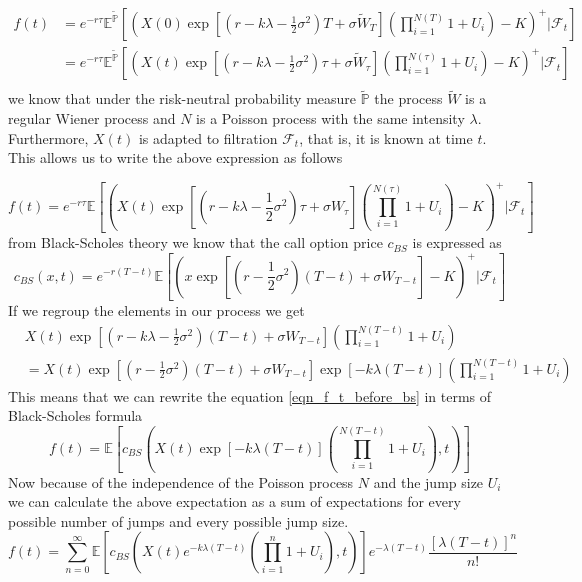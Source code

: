 \documentclass[times, utf8, diplomski]{fer}
\begin{document}
\begin{align*}
	f(t) &= e^{-r\tau} \mathbb{E}^{\tilde{\mathbb{P}}}\left[\left(X(0)\exp\left[ (r - k\lambda- \frac{1}{2}\sigma^2)T + \sigma \tilde{W}_{T} \right]\left(\prod_{i=1}^{N(T)}1+U_i\right) - K \right)^+\Bigg|\mathcal{F}_t\right] \\
		 &= e^{-r\tau} \mathbb{E}^{\tilde{\mathbb{P}}}\left[\left(X(t)\exp\left[ (r - k\lambda- \frac{1}{2}\sigma^2)\tau + \sigma \tilde{W}_{\tau} \right]\left(\prod_{i=1}^{N(\tau)}1+U_i\right) - K \right)^+\Bigg|\mathcal{F}_t\right] \\
\end{align*} we know that under the risk-neutral probability measure $\tilde{\mathbb{P}}$ the process $\tilde{W}$ is a regular Wiener process and $N$ is a Poisson process with the same intensity $\lambda$. Furthermore, $X(t)$ is adapted to filtration $\mathcal{F}_t$, that is, it is known at time $t$. This allows us to write the above expression as follows

\begin{equation} \label{eqn_f_t_before_bs}
	f(t) = e^{-r\tau} \mathbb{E}\left[\left(X(t)\exp\left[ (r - k\lambda- \frac{1}{2}\sigma^2)\tau + \sigma W_{\tau} \right]\left(\prod_{i=1}^{N(\tau)}1+U_i\right) - K \right)^+\Bigg|\mathcal{F}_t\right]
\end{equation} from Black-Scholes theory we know that the call option price $c_{BS}$ is expressed as 
\begin{equation*}
	c_{BS}(x,t) = e^{-r(T-t)} \mathbb{E}\left[\left(x\exp\left[ (r - \frac{1}{2}\sigma^2)(T-t) + \sigma W_{T-t} \right] - K \right)^+\Bigg|\mathcal{F}_t\right]
\end{equation*} If we regroup the elements in our process we get 
\begin{align*}
	&X(t)\exp\left[ (r - k\lambda- \frac{1}{2}\sigma^2)(T-t) + \sigma W_{T-t} \right]\left(\prod_{i=1}^{N(T-t)}1+U_i\right) \\
	&= X(t)\exp\left[ (r - \frac{1}{2}\sigma^2)(T-t) + \sigma W_{T-t} \right]\exp\left[ -k\lambda(T-t) \right]\left(\prod_{i=1}^{N(T-t)}1+U_i\right)
\end{align*} This means that we can rewrite the equation \ref{eqn_f_t_before_bs} in terms of Black-Scholes formula
\begin{equation}
	f(t) = \mathbb{E}\left[c_{BS}\left(X(t)\exp\left[ -k\lambda(T-t) \right]\left(\prod_{i=1}^{N(T-t)}1+U_i\right), t\right)\right]
\end{equation} Now because of the independence of the Poisson process $N$ and the jump size $U_i$ we can calculate the above expectation as a sum of expectations for every possible number of jumps and every possible jump size.
\begin{equation}
	f(t) = \sum_{n=0}^{\infty}\mathbb{E}\left[c_{BS}\left(X(t)e^{-k\lambda(T-t)}\left(\prod_{i=1}^{n}1+U_i\right), t\right)\right]e^{-\lambda(T-t)}\frac{[\lambda(T-t)]^n}{n!}
\end{equation}
\end{document}
